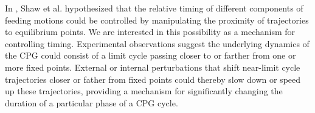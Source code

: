 \documentclass[12pt]{article}
\begin{document}
 

 
 In \cite{ShawParkChielThomas2012SIADS}, Shaw et al. hypothesized that the relative timing of different components of feeding motions could be controlled by manipulating the proximity of trajectories to equilibrium points.  We are interested in this possibility as a mechanism for controlling timing.  Experimental observations suggest the underlying dynamics of the CPG could consist of a limit cycle passing closer to or farther from one or more fixed points.  External or internal perturbations that shift near-limit cycle trajectories closer or father from fixed points could thereby slow down or speed up these trajectories, providing a mechanism for significantly changing the duration of a particular phase of a CPG cycle.
 
\end{document}
